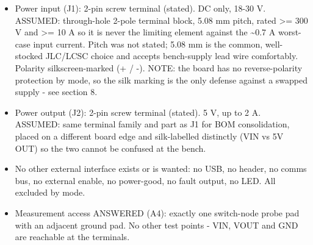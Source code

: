 \documentclass[11pt,a4paper]{article}
\begin{document}
\begin{itemize}
\item Power input (J1): 2-pin screw terminal (stated). DC only, 18-30 V.
ASSUMED: through-hole 2-pole terminal block, 5.08 mm pitch, rated
\textgreater{}= 300 V and \textgreater{}= 10 A so it is never the limiting element against the
\textasciitilde{}0.7 A worst-case input current. Pitch was not stated; 5.08 mm is the
common, well-stocked JLC/LCSC choice and accepts bench-supply lead wire
comfortably. Polarity silkscreen-marked (+ / -). NOTE: the board has no
reverse-polarity protection by mode, so the silk marking is the only
defense against a swapped supply - see section 8.
\item Power output (J2): 2-pin screw terminal (stated). 5 V, up to 2 A.
ASSUMED: same terminal family and part as J1 for BOM consolidation,
placed on a different board edge and silk-labelled distinctly (VIN vs
5V OUT) so the two cannot be confused at the bench.
\item No other external interface exists or is wanted: no USB, no header, no
comms bus, no external enable, no power-good, no fault output, no LED.
All excluded by mode.
\item Measurement access ANSWERED (A4): exactly one switch-node probe pad with
an adjacent ground pad. No other test points - VIN, VOUT and GND are
reachable at the terminals.
\end{itemize}
\end{document}
